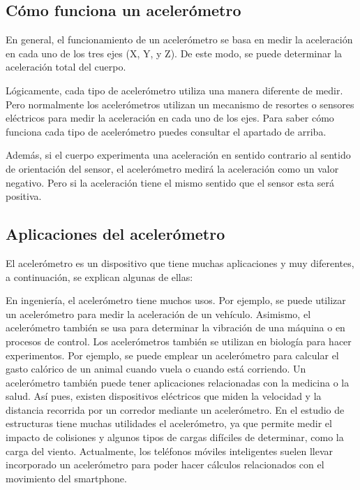 \subsection{ Cómo funciona un acelerómetro}

En general, el funcionamiento de un acelerómetro se basa en medir la aceleración en cada uno de los tres ejes (X, Y, y Z). De este modo, se puede determinar la aceleración total del cuerpo.

Lógicamente, cada tipo de acelerómetro utiliza una manera diferente de medir. Pero normalmente los acelerómetros utilizan un mecanismo de resortes o sensores eléctricos para medir la aceleración en cada uno de los ejes. Para saber cómo funciona cada tipo de acelerómetro puedes consultar el apartado de arriba.

Además, si el cuerpo experimenta una aceleración en sentido contrario al sentido de orientación del sensor, el acelerómetro medirá la aceleración como un valor negativo. Pero si la aceleración tiene el mismo sentido que el sensor esta será positiva.

\subsection{Aplicaciones del acelerómetro}

El acelerómetro es un dispositivo que tiene muchas aplicaciones y muy diferentes, a continuación, se explican algunas de ellas:

En ingeniería, el acelerómetro tiene muchos usos. Por ejemplo, se puede utilizar un acelerómetro para medir la aceleración de un vehículo. Asimismo, el acelerómetro también se usa para determinar la vibración de una máquina o en procesos de control.
Los acelerómetros también se utilizan en biología para hacer experimentos. Por ejemplo, se puede emplear un acelerómetro para calcular el gasto calórico de un animal cuando vuela o cuando está corriendo.
Un acelerómetro también puede tener aplicaciones relacionadas con la medicina o la salud. Así pues, existen dispositivos eléctricos que miden la velocidad y la distancia recorrida por un corredor mediante un acelerómetro.
En el estudio de estructuras tiene muchas utilidades el acelerómetro, ya que permite medir el impacto de colisiones y algunos tipos de cargas difíciles de determinar, como la carga del viento.
Actualmente, los teléfonos móviles inteligentes suelen llevar incorporado un acelerómetro para poder hacer cálculos relacionados con el movimiento del smartphone.

